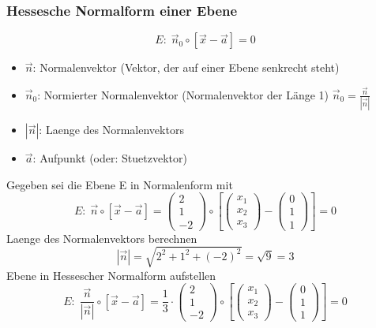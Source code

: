 \begin{multicols*}{2}
    \subsubsection{Hessesche Normalform einer Ebene}
    \[E\colon\; \vec{n}_0 \circ [\vec{x} - \vec{a}] = 0\]
    \begin{itemize}
        \item  $\vec{n}$: Normalenvektor (Vektor, der auf einer Ebene senkrecht steht)
        \item  $\vec{n}_0$: Normierter Normalenvektor (Normalenvektor der Länge 1) $\vec{n}_0 = \frac{\vec{n}}{|\vec{n}|}$
        \item  $|\vec{n}|$: Laenge des Normalenvektors
        \item  $\vec{a}$: Aufpunkt (oder: Stuetzvektor)
    \end{itemize}
    Gegeben sei die Ebene E in Normalenform mit
    \[E\colon\; \vec{n} \circ \left[\vec{x} - \vec{a}\right] = \begin{pmatrix} 2 \\ 1 \\ -2 \end{pmatrix} \circ \left[\begin{pmatrix} x_1 \\ x_2 \\ x_3 \end{pmatrix} - \begin{pmatrix} 0 \\ 1 \\ 1 \end{pmatrix}\right] = 0\]
    Laenge des Normalenvektors berechnen
    \[|\vec{n}| = \sqrt{2^2 + 1^2 + (-2)^2} = \sqrt{9} = 3\]
    Ebene in Hessescher Normalform aufstellen
    \[E\colon\; \frac{\vec{n}}{|\vec{n}|} \circ \left[\vec{x} - \vec{a}\right] = \frac{1}{3} \cdot \begin{pmatrix} 2 \\ 1 \\ -2 \end{pmatrix} \circ \left[\begin{pmatrix} x_1 \\ x_2 \\ x_3 \end{pmatrix} - \begin{pmatrix} 0 \\ 1 \\ 1 \end{pmatrix}\right] = 0\]

\end{multicols*}

